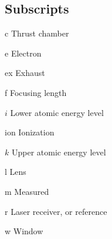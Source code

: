 \begin{multicols}{2}
    \section*{Subscripts}
    \begin{nomlist}
        \item[c]                Thrust chamber
        \item[e]                Electron
        \item[ex]               Exhaust
        \item[f]                Focusing length
        \item[$i$]              Lower atomic energy level 
        \item[ion]              Ionization
        \item[$k$]              Upper atomic energy level 
        \item[l]                Lens
        \item[m]                Measured
        \item[r]                Laser receiver, or reference
        \item[w]                Window
    \end{nomlist}


\end{multicols}